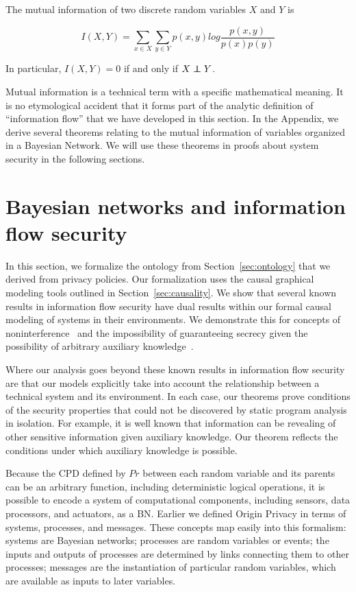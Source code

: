 \documentclass[../thesis.tex]{subfiles}
\begin{document}
\begin{dfn}
  The mutual information of two discrete random variables
  $X$ and $Y$ is

  $$I(X,Y) = \sum_{x \in X} \sum_{y \in Y} p(x,y) log \frac{p(x,y)}{p(x)p(y)}$$
\end{dfn}

In particular, $I(X,Y) = 0$ if and only if $X \independent Y$.

Mutual information is a technical term with a specific mathematical
meaning.
It is no etymological accident that it forms part of the analytic
definition of ``information flow'' that we have developed in this
section.
In the Appendix, we derive several theorems relating to
the mutual information of variables organized in a Bayesian
Network.
We will use these theorems in proofs about system security
in the following sections.

\section{Bayesian networks and information flow security}
\label{sec:security}

In this section, we formalize the ontology from
Section~\ref{sec:ontology} that we derived from
privacy policies.
Our formalization uses the causal graphical modeling
tools outlined in Section~\ref{sec:causality}.
We show that several known results in information flow
security have dual results within our formal causal modeling
of systems in their environments.
We demonstrate this for concepts of 
noninterference~\cite{gm82security} and the impossibility
of guaranteeing secrecy given the possibility of
arbitrary auxiliary knowledge~\cite{dwork06icalp,dwork08jpc}.

Where our analysis goes beyond these known results
in information flow security are that our models
explicitly take into account the relationship between
a technical system and its environment.
In each case, our theorems prove conditions of the
security properties that could not be discovered
by static program analysis in isolation.
For example, it is well known that information
can be revealing of other sensitive information given
auxiliary knowledge. Our theorem reflects the conditions
under which auxiliary knowledge is possible.

Because the CPD defined by \(Pr\) between each random
variable and its
parents can be an arbitrary function, including deterministic
logical operations, it is possible to encode a system of
computational components, including sensors, data processors,
and actuators, as a BN.
Earlier we defined Origin Privacy in terms of systems, processes,
and messages.
These concepts map easily into this formalism: systems are
Bayesian networks; processes are random variables or events;
the inputs and outputs of processes are determined by links
connecting them to other processes; messages are
the instantiation 
of particular random variables,
which are available as inputs to
later variables.
\end{document}
